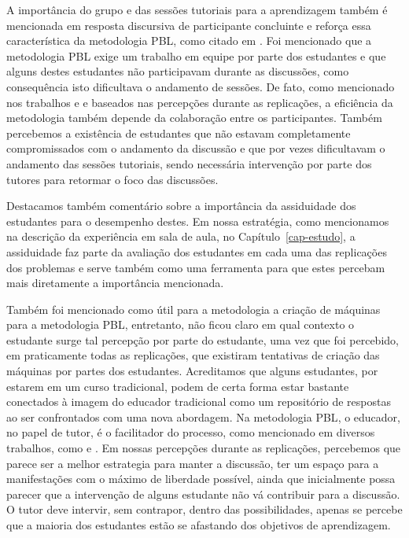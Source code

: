 A importância do grupo e das sessões tutoriais para a aprendizagem
também é mencionada em resposta discursiva de participante concluinte
e reforça essa característica da metodologia \ac{PBL}, como citado
em .
Foi mencionado que a metodologia \ac{PBL} exige um trabalho em equipe por
parte dos estudantes e que alguns destes estudantes não participavam
durante as discussões, como consequência isto dificultava o
andamento de sessões.
De fato, como mencionado nos
trabalhos  e 
e baseados nas percepções durante as replicações, a eficiência da metodologia
também depende da colaboração entre os participantes.
Também percebemos a existência de estudantes que não estavam
completamente compromissados com o andamento da discussão e que
por vezes dificultavam o andamento das sessões tutoriais, sendo necessária
intervenção por parte dos tutores para retormar o foco das discussões.

Destacamos também comentário sobre a importância da assiduidade dos
estudantes para o desempenho destes.
Em nossa estratégia, como mencionamos na descrição da experiência
em sala de aula, no Capítulo~\ref{cap-estudo}, a assiduidade faz
parte da avaliação dos estudantes em cada uma das replicações dos
problemas e serve também como uma ferramenta para que estes
percebam mais diretamente a importância mencionada.

Também foi mencionado como útil para a metodologia a criação de máquinas
para a metodologia \ac{PBL}, entretanto, não ficou claro em qual contexto
o estudante surge tal percepção por parte do estudante,
uma vez que foi percebido, em praticamente todas as replicações, que
existiram tentativas de criação das máquinas por partes
dos estudantes.
Acreditamos que alguns estudantes, por estarem em um curso
tradicional, podem de certa forma estar bastante conectados
à imagem do educador tradicional como um repositório de
respostas ao ser confrontados com uma nova abordagem.
Na metodologia \ac{PBL}, o educador, no papel de tutor, é o facilitador
do processo, como mencionado em diversos trabalhos, como
 e .
Em nossas percepções durante as replicações, percebemos que
parece ser a melhor estrategia para manter a discussão, ter um
espaço para a manifestações com o máximo de liberdade possível,
ainda que inicialmente possa parecer que a intervenção
de alguns estudante não vá contribuir para
a discussão.
O tutor deve intervir, sem contrapor, dentro das possibilidades,
apenas se percebe que a maioria dos estudantes estão se afastando
dos objetivos de aprendizagem.

